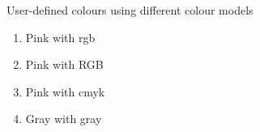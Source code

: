 \documentclass{article}
\begin{document}
User-defined colours using different colour models

\begin{enumerate}
\item \textcolor{myColor1}{Pink with rgb}
\item \textcolor{myColor2}{Pink with RGB}
\item \textcolor{myColor3}{Pink with cmyk}
\item \textcolor{mygray}{Gray with gray}
\end{enumerate}
\end{document}
